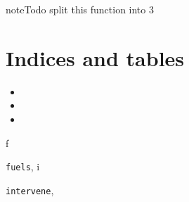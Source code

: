 \documentclass[letterpaper,10pt,english]{sphinxmanual}
\begin{document}
\begin{fulllineitems}
\begin{fulllineitems}
\begin{notice}{note}{Todo}
split this function into 3
\end{notice}

\end{fulllineitems}


\begin{fulllineitems}
\label{SpaceCrowns:intervene.SpaceCrowns.treatment_collection}
\end{fulllineitems}


\end{fulllineitems}



\chapter{Indices and tables}
\label{index:indices-and-tables}\begin{itemize}
\item {} 

\item {} 

\item {} 

\end{itemize}


\renewcommand{\indexname}{Python Module Index}
\begin{theindex}
\def\bigletter#1{{\Large\sffamily#1}\nopagebreak\vspace{1mm}}
\bigletter{f}
\item {\texttt{fuels}}, \pageref{fuels:module-fuels}
\indexspace
\bigletter{i}
\item {\texttt{intervene}}, \pageref{intervene:module-intervene}
\end{theindex}

\renewcommand{\indexname}{Index}
\printindex
\end{document}
